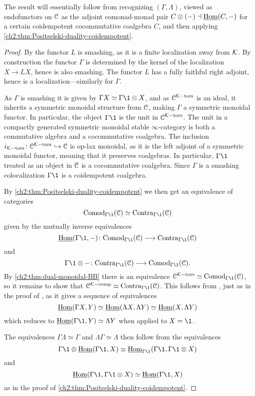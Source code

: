 \begin{remark}
    The result will essentially follow from recognizing $(\Gamma, \Lambda)$, viewed as endofunctors on $\EuScript{C}$ as the adjoint comonad-monad pair $C\otimes (-)\dashv \operatorname{\underline{Hom}}(C,-)$ for a certain coidempotent cocommutative coalgebra $C$, and then applying \cref{ch2:thm:Positselski-duality-coidempotent}. 
\end{remark}

\begin{proof}
    By \cite[3.3.3]{hovey-palmiery-strickland_97} the functor $L$ is smashing, as it is a finite localization away from $\mathcal{K}$. By construction the functor $\Gamma$ is determined by the kernel of the localization $X\to LX$, hence is also smashing. The functor $L$ has a fully faithful right adjoint, hence is a localization---similarly for $\Gamma$. 

    As $\Gamma$ is smashing it is given by $\Gamma X \simeq \Gamma \1 \otimes X$, and as $\EuScript{C}^{\mathcal{K}-\mathrm{tors}}$ is an ideal, it inherits a symmetric monoidal structure from $\EuScript{C}$, making $\Gamma$ a symmetric monoidal functor. In particular, the object $\Gamma \1$ is the unit in $\EuScript{C}^{\mathcal{K}-\mathrm{tors}}$. The unit in a compactly generated symmetric monoidal stable $\infty$-category is both a commutative algebra and a cocommutative coalgebra. The inclusion $i_{\mathcal{K}-\mathrm{tors}}\colon \EuScript{C}^{\mathcal{K}-\mathrm{tors}}\hookrightarrow \EuScript{C}$ is op-lax monoidal, as it is the left adjoint of a symmetric monoidal functor, meaning that it preserves coalgebras. In particular, $\Gamma\1$ treated as an object in $\EuScript{C}$ is a cocommutative coalgebra. Since $\Gamma$ is a smashing colocalization $\Gamma \1$ is a coidempotent coalgebra. 

    By \cref{ch2:thm:Positselski-duality-coidempotent} we then get an equivalence of categories 
    \[\Comod_{\Gamma \1}(\C) \simeq \Contra_{\Gamma \1}(\C)\]
    given by the mutually inverse equivalences 
    \[\iHom(\Gamma \1,-)\: \Comod_{\Gamma\1}(\C) \to \Contra_{\Gamma \1}(\C)\] 
    and 
    \[\Gamma \1\otimes -\: \Contra_{\Gamma\1}(\C) \to \Comod_{\Gamma \1}(\C).\]
    By \cref{ch2:thm:dual-monoidal-BB} there is an equivalence $\C\Ktors\simeq \Comod_{\Gamma\1}(\C)$, so it remains to show that $\C\Kcomp\simeq \Contra_{\Gamma \1}(\C)$. This follows from \cite[2.2]{barthel-heard-valenzuela_2018}, just as in the proof of \cite[2.21(4)]{barthel-heard-valenzuela_2018}, as it gives a sequence of equivalences 
    \[\operatorname{\underline{Hom}}(\Gamma X, Y) \simeq \operatorname{\underline{Hom}}(\Lambda X, \Lambda Y)\simeq \operatorname{\underline{Hom}}(X, \Lambda Y)\]
    which reduces to $\iHom(\Gamma \1, Y) \simeq \Lambda Y$ when applied to $X=\1$. 

    The equivalences $\Gamma \Lambda \simeq \Gamma$ and $\Lambda\Gamma \simeq \Lambda$ then follow from the equivalences 
    \[\Gamma \1 \otimes \iHom(\Gamma\1, X)\simeq \iHom_{\Gamma\1}(\Gamma\1, \Gamma\1\otimes X)\]  
    and 
    \[\iHom(\Gamma\1, \Gamma\1\otimes X)\simeq \iHom(\Gamma \1, X)\] 
    as in the proof of \cref{ch2:thm:Positselski-duality-coidempotent}. 
\end{proof}

